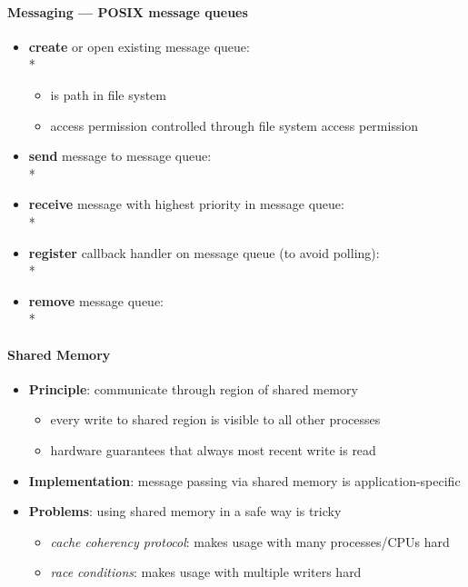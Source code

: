 \paragraph{Messaging --- POSIX message queues}
\begin{itemize}
  \item \textbf{create} or open existing message queue: \\*
    \begin{itemize}
      \item {} is path in file system
      \item access permission controlled through file system access permission
    \end{itemize}
  \item \textbf{send} message to message queue: \\*
  \item \textbf{receive} message with highest priority in message queue: \\*
  \item \textbf{register} callback handler on message queue (to avoid polling): \\*
  \item \textbf{remove} message queue: \\*
\end{itemize}

\paragraph{Shared Memory}
\begin{itemize}
  \item \textbf{Principle}: communicate through region of shared memory
  \begin{itemize}
    \item every write to shared region is visible to all other processes
    \item hardware guarantees that always most recent write is read
  \end{itemize}
  \item \textbf{Implementation}: message passing via shared memory is application-specific
  \item \textbf{Problems}: using shared memory in a safe way is tricky
  \begin{itemize}
    \item \emph{cache coherency protocol}: makes usage with many processes/CPUs hard
    \item \emph{race conditions}: makes usage with multiple writers hard
  \end{itemize}
\end{itemize}


